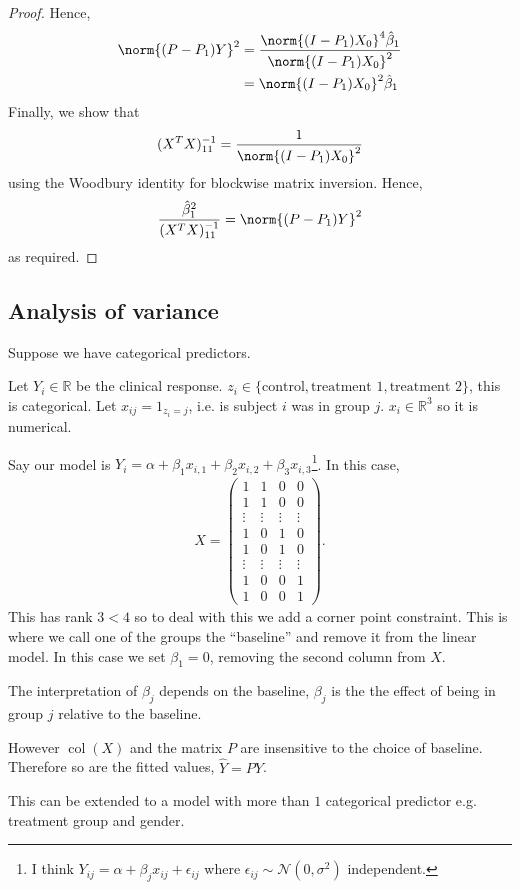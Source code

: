 \begin{proof}
	Hence,
	\begin{align*}
		\norm{(P-P_1)Y}^2 &= \frac{\norm{(I-P_1)X_0}^4 \hat \beta_1}{\norm{(I-P_1)X_0}^2} \\
		&= \norm{(I-P_1)X_0}^2 \hat \beta_1
	\end{align*}
	Finally, we show that
	\begin{align*}
		(X^\tran X)^{-1}_{11} = \frac{1}{\norm{(I-P_1)X_0}^2}
	\end{align*}
	using the Woodbury identity for blockwise matrix inversion.
	Hence,
	\begin{align*}
		\frac{\hat\beta_1^2}{(X^\tran X)^{-1}_{11}} = \norm{(P-P_1) Y}^2
	\end{align*}
	as required.
\end{proof}

\subsection{Analysis of variance}
Suppose we have categorical predictors.

\begin{example}
	Let $Y_i \in \mathbb{R}$ be the clinical response.
	$z_i \in \{\text{control}, \text{treatment 1}, \text{treatment 2}\}$, this is categorical.
	Let $x_{ij} = 1_{z_i = j}$, i.e. is subject $i$ was in group $j$.
	$x_i \in \mathbb{R}^3$ so it is numerical.

	Say our model is $Y_i = \alpha + \beta_1 x_{i, 1} + \beta_2 x_{i,2} + \beta_3 x_{i, 3}$\footnote{I think $Y_{ij} = \alpha + \beta_j x_{ij} + \epsilon_{ij}$ where $\epsilon_{ij} \sim \mathcal{N}(0, \sigma^2)$ independent.}.
	In this case, \begin{align*}
		X = \begin{pmatrix}
			1      & 1 		& 0      & 0      \\
			1      & 1 		& 0      & 0      \\
			\vdots & \vdots & \vdots & \vdots \\
			1      & 0 		& 1      & 0      \\
			1      & 0 		& 1      & 0      \\
			\vdots & \vdots & \vdots & \vdots \\
			1      & 0 		& 0      & 1      \\
			1      & 0 		& 0      & 1
		\end{pmatrix}.
	\end{align*} 
	This has rank $3 < 4$ so to deal with this we add a corner point constraint.
	This is where we call one of the groups the ``baseline'' and remove it from the linear model.
	In this case we set $\beta_1 = 0$, removing the second column from $X$.

	The interpretation of $\beta_j$ depends on the baseline, $\beta_j$ is the the effect of being in group $j$ relative to the baseline.

	However $\operatorname{col}(X)$ and the matrix $P$ are insensitive to the choice of baseline.
	Therefore so are the fitted values, $\hat{Y} = PY$.

	This can be extended to a model with more than $1$ categorical predictor e.g. treatment group and gender. 
\end{example} 

